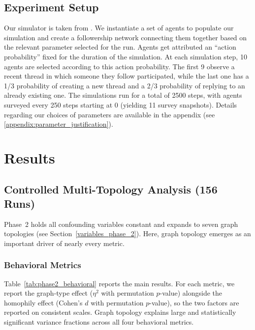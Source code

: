 \documentclass[11pt]{article}
\begin{document}
\subsection{Experiment Setup}

Our simulator is taken from \cite{bückkaeffer2026textitsiliconsocietycookbookdesign}. We instantiate a set of agents to populate our simulation and create a followership network connecting them together based on the relevant parameter selected for the run. Agents get attributed an ``action probability'' fixed for the duration of the simulation. At each simulation step, 10 agents are selected according to this action probability. The first 9 observe a recent thread in which someone they follow participated, while the last one has a 1/3 probability of creating a new thread and a 2/3 probability of replying to an already existing one. The simulations run for a total of 2500 steps, with agents surveyed every 250 steps starting at 0 (yielding 11 survey snapshots). Details regarding our choices of parameters are available in the appendix (see \ref{appendix:parameter_justification}). %


\section{Results}

\subsection{Controlled Multi-Topology Analysis (156 Runs)}
\label{sec:phase2}

Phase~2 holds all confounding variables constant and expands to seven graph topologies (see Section~\ref{variables_phase_2}). Here, graph topology emerges as an important driver of nearly every metric.

\subsubsection{Behavioral Metrics}

Table~\ref{tab:phase2_behavioral} reports the main results. For each metric, we report the graph-type effect ($\eta^2$ with permutation $p$-value) alongside the homophily effect (Cohen's $d$ with permutation $p$-value), so the two factors are reported on consistent scales. Graph topology explains large and statistically significant variance fractions across all four behavioral metrics.
\end{document}
